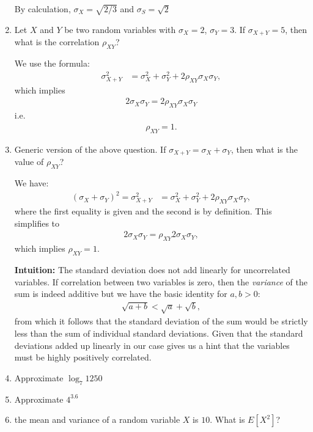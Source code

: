 \documentclass{amsart}
\theoremstyle{plain}
\numberwithin{equation}{section}
\begin{document}
\begin{enumerate}
By calculation, $\sigma_X = \sqrt{2/3}$ and 
$\sigma_S = \sqrt{2}$

\item Let $X$ and $Y$ be two random variables with
$\sigma_X=2$, $\sigma_Y=3$. If $\sigma_{X+Y} = 5$, 
then what is the correlation $\rho_{XY}$?

We use the formula:
\begin{align*}
\sigma_{X+Y}^2 &= \sigma_{X}^2 + \sigma_{Y}^2 + 2 \rho_{XY} \sigma_X \sigma_Y,
\end{align*}
which implies
\begin{align*}
2 \sigma_X \sigma_Y = 
2 \rho_{XY} \sigma_X \sigma_Y
\end{align*}
i.e.\,
\begin{align*}
\rho_{XY} = 1.
\end{align*}

\item Generic version of the above question. If 
$\sigma_{X+Y} = \sigma_X + \sigma_Y$, then what is the 
value of $\rho_{XY}$?

We have:
\begin{align*}
(\sigma_X + \sigma_Y)^2 = \sigma_{X+Y}^2 &= \sigma_{X}^2 + \sigma_{Y}^2 + 
2 \rho_{XY} \sigma_X \sigma_Y,
\end{align*}
where the first equality is given and the second is by 
definition. This simplifies to 
\begin{align*}
2\sigma_X \sigma_Y = \rho_{XY} 2\sigma_X \sigma_Y,
\end{align*}
which implies $\rho_{XY} = 1$.

\textbf{Intuition:} The standard deviation
does not add linearly for uncorrelated variables. 
If correlation between two variables is zero, then 
the \emph{variance} of the sum is indeed additive
but we have the basic identity for $a, b>0$:
\begin{align*}
\sqrt{a + b}<\sqrt{a} + \sqrt{b},
\end{align*}
from which it follows that the standard deviation of 
the sum would be
strictly less than the sum of individual 
standard deviations. Given that the standard 
deviations added up linearly in our case gives us 
a hint that the variables must be highly positively correlated. 


\item Approximate $\log_{7}1250$ 

\item Approximate $4^{3.6}$

\item the mean and variance of a random variable $X$ is $10$. What is
$E[X^2]$?


\end{enumerate}
\end{document}
